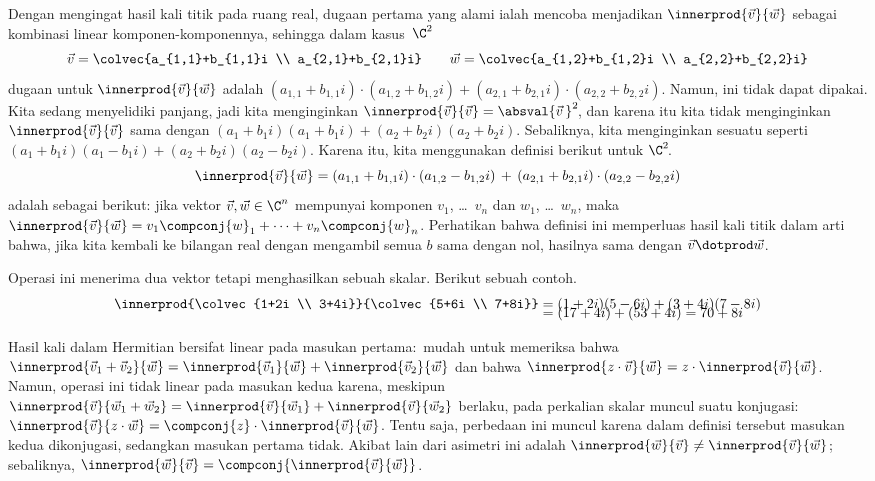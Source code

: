 Dengan mengingat hasil kali titik pada ruang real,
dugaan pertama yang alami ialah mencoba menjadikan
$\innerprod{\vec{v}}{\vec{w}}$
sebagai kombinasi linear komponen-komponennya, sehingga dalam kasus~$\C^2$
\begin{equation*}
  \vec{v}=\colvec{a_{1,1}+b_{1,1}i \\ a_{2,1}+b_{2,1}i}
  \qquad
  \vec{w}=\colvec{a_{1,2}+b_{1,2}i \\ a_{2,2}+b_{2,2}i}
\end{equation*}
dugaan untuk $\innerprod{\vec{v}}{\vec{w}}$ adalah
$(a_{1,1}+b_{1,1}i)\cdot(a_{1,2}+b_{1,2}i)+(a_{2,1}+b_{2,1}i)\cdot(a_{2,2}+b_{2,2}i)$.
Namun, ini tidak dapat dipakai.
Kita sedang menyelidiki panjang,
jadi kita menginginkan $\innerprod{\vec{v}}{\vec{v}}=\absval{\vec{v}\,}^2\!$,
dan karena itu kita tidak menginginkan $\innerprod{\vec{v}}{\vec{v}}$ sama dengan
$(a_1+b_1i)(a_1+b_1i)+(a_2+b_2i)(a_2+b_2i)$.
Sebaliknya, kita menginginkan sesuatu seperti
$(a_1+b_1i)(a_1-b_1i)+(a_2+b_2i)(a_2-b_2i)$.
Karena itu, kita menggunakan definisi berikut untuk $\C^2\!$.
\begin{equation*}
  \innerprod{\vec{v}}{\vec{w}}
  =(a_{1,1}+b_{1,1}i)\cdot(a_{1,2}-b_{1,2}i)\,+\,(a_{2,1}+b_{2,1}i)\cdot(a_{2,2}-b_{2,2}i)
\end{equation*}
adalah sebagai berikut:
jika vektor $\vec{v},\vec{w}\in\C^n$
mempunyai komponen $v_1$, \ldots~$v_n$ dan $w_1$, \ldots~$w_n$, maka
$\innerprod{\vec{v}}{\vec{w}}=v_1\compconj{w}_1+\cdots+v_n\compconj{w}_n$.
Perhatikan bahwa definisi ini memperluas hasil kali titik dalam arti bahwa,
jika kita kembali ke bilangan real dengan mengambil semua $b$ sama dengan nol,
hasilnya sama dengan $\vec{v}\dotprod\vec{w}$.

Operasi ini menerima dua vektor tetapi menghasilkan sebuah skalar.
Berikut sebuah contoh.
\begin{align*}
  \innerprod{\colvec{1+2i \\ 3+4i}}{\colvec{5+6i \\ 7+8i}}
  &=(1+2i)(5-6i)+(3+4i)(7-8i)                     \\[-2ex]
  &=(17+4i)+(53+4i)=70+8i
\end{align*}

Hasil kali dalam Hermitian bersifat linear pada masukan pertama:~mudah untuk memeriksa bahwa
$\innerprod{\vec{v}_1+\vec{v}_2}{\vec{w}}
 = \innerprod{\vec{v}_1}{\vec{w}}
   +\innerprod{\vec{v}_2}{\vec{w}}$
 dan bahwa
$\innerprod{z\cdot\vec{v}}{\vec{w}}
     =z\cdot\innerprod{\vec{v}}{\vec{w}}$.
Namun, operasi ini tidak linear pada masukan kedua karena, meskipun
$\innerprod{\vec{v}}{\vec{w}_1+\vec{w}_2}
 = \innerprod{\vec{v}}{\vec{w}_1}
   +\innerprod{\vec{v}}{\vec{w}_2}$
berlaku, pada perkalian skalar muncul suatu konjugasi:
$\innerprod{\vec{v}}{z\cdot\vec{w}}
     =\compconj{z}\cdot\innerprod{\vec{v}}{\vec{w}}$.
Tentu saja, perbedaan ini muncul karena dalam definisi tersebut
masukan kedua dikonjugasi, sedangkan masukan pertama tidak.
Akibat lain dari asimetri ini adalah
$\innerprod{\vec{w}}{\vec{v}}\neq \innerprod{\vec{v}}{\vec{w}}$; sebaliknya,
$\innerprod{\vec{w}}{\vec{v}}=\compconj{\innerprod{\vec{v}}{\vec{w}}}$.

